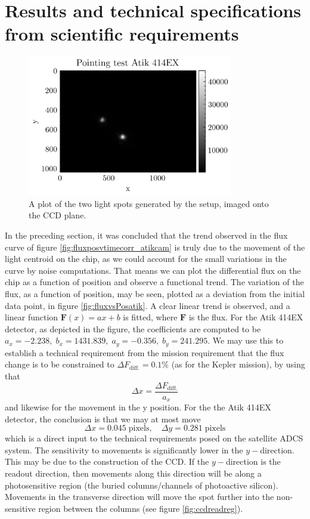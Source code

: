 \documentclass[../main.tex]{subfiles}
\begin{document}
\section{Results and technical specifications from scientific requirements}\label{sec:secondreq}
\begin{figure}[h!]
	\centering
	\includegraphics[width = 0.8\textwidth]{pointingtest_atik.png}
	\caption{A plot of the two light spots generated by the setup, imaged onto the CCD plane.}
	\label{fig:atikspots}
\end{figure}
In the preceding section, it was concluded that the trend observed in the flux curve of figure \ref{fig:fluxposvtimecorr_atikcam} is truly due to the movement of the light centroid on the chip, as we could account for the small variations in the curve by noise computations. That means we can plot the differential flux on the chip as a function of position and observe a functional trend. The variation of the flux, as a function of position, may be seen, plotted as a deviation from the initial data point, in figure \ref{fig:fluxvsPosatik}. A clear linear trend is observed, and a linear function $\bm F(x) = ax + b$ is fitted, where $\bm F$ is the flux. For the Atik 414EX detector, as depicted in the figure, the coefficients are computed to be $a_x = -2.238,\;b_x =  1431.839,\;a_y = -0.356,\;b_y =  241.295$. We may use this to establish a technical requirement from the mission requirement that the flux change is to be constrained to $\Delta F_\text{diff.} = 0.1 \%$ (as for the Kepler mission), by using that 
\begin{equation}
	\Delta x = \frac{\Delta F_\text{diff.}}{a_x}
\end{equation}
and likewise for the movement in the y position. For the the Atik 414EX detector, the conclusion is that we may at most move 
\begin{equation}
	\Delta x =  0.045 \;\text{pixels}, \quad
	\Delta y =  0.281 \;\text{pixels}
\end{equation}
which is a direct input to the technical requirements posed on the satellite ADCS system. The sensitivity to movements is significantly lower in the $y-$direction. This may be due to the construction of the CCD. If the $y-$direction is the readout direction, then movements along this direction will be along a photosensitive region (the buried columns/channels of photoactive silicon). Movements in the transverse direction will move the spot further into the non-sensitive region between the columns (see figure \ref{fig:ccdreadreg}).
\end{document}
